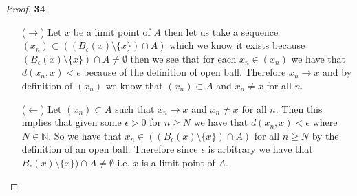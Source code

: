 \documentclass[11pt]{article}
\newcommand{\N}{\mathbb{N}}
\theoremstyle{definition}
\begin{document}
\cleardoublepage
    \begin{proof}{\textbf{34}}
        \begin{itemize}
        \item [($\rightarrow$)] Let $x$ be a limit point of $A$ then let us
        take a sequence $(x_n) \subset ((B_\epsilon(x) \setminus \{x\}) \cap A)$
        which we know it exists because 
        $(B_\epsilon(x) \setminus \{x\}) \cap A \neq \emptyset$ then
        we see that for each $x_n \in (x_n)$ we have that $d(x_n, x) < \epsilon$
        because of the definition of open ball. Therefore $x_n \to x$ and by
        definition of $(x_n)$ we know that $(x_n) \subset A$ and $x_n \neq x$
        for all $n$.
        \item [($\leftarrow$)] Let $(x_n) \subset A$ such that $x_n \to x$ and
        $x_n \neq x$ for all $n$. Then this implies that given some $\epsilon > 0$
        for $n \geq N$ we have that $d(x_n,x) < \epsilon$ where $N \in \N$.
        So we have that $x_n \in ((B_\epsilon(x) \setminus \{x\}) \cap A)$
        for all $n \geq N$ by the definition of an open ball. Therefore since
        $\epsilon$ is arbitrary we have that
        $B_\epsilon(x) \setminus \{x\}) \cap A \neq \emptyset$ i.e. $x$ is a
        limit point of $A$.
        \end{itemize}
    \end{proof}
\end{document}
